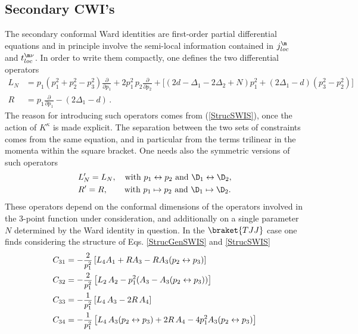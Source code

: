 \documentclass[a4paper,11pt,openright,twoside]{book}
\let\n=\nu      \let\x=\xi     \let\p=\pi      \let\r=\rho
\newcommand{\sdfrac}[2]{\mbox{\small$\displaystyle\frac{#1}{#2}$}}
\numberwithin{equation}{section}
\begin{document}
{{{\subsection{Secondary CWI's}
\label{secsection}
The secondary conformal Ward identities are first-order partial differential equations and in principle involve the semi-local information contained in $j_{loc}^\m$ and $t^{\m\n}_{loc}$. In order to write them compactly, one defines the two differential operators
\begin{align}
	L_N&= p_1(p_1^2 + p_2^2 - p_3^2) \frac{\partial}{\partial p_1} + 2 p_1^2\, p_2 \frac{\partial}{\partial p_2} + \big[ (2d - \Delta_1 - 2\Delta_2 +N)p_1^2 + (2\Delta_1-d)(p_3^2-p_2^2)  \big] \label{Ldef2} \\
	R &= p_1 \frac{\partial}{\partial p_1} - (2\Delta_1-d) \label{Rdef2}\,. 
\end{align}
The reason for introducing such operators comes from (\ref{StrucSWIS}), once the action of 
$K^\kappa$ is made explicit. The separation between the two sets of constraints comes from the same equation, and in particular from the terms trilinear in the momenta within the square bracket. One needs also the symmetric versions of such operators
\begin{align}
	&L'_N=L_N,\quad\text{with}\ p_1\leftrightarrow p_2\ \text{and}\ \D_1\leftrightarrow\D_2,\\
	&R'=R,\qquad\text{with}\ p_1\mapsto p_2\ \text{and}\ \D_1\mapsto\D_2.
\end{align}
These operators depend on the conformal dimensions of the operators involved in the 3-point function under consideration, and additionally on a single parameter $N$ determined by the Ward identity in question. In the $\braket{TJJ}$ case one finds considering the structure of Eqs. \eqref{StrucGenSWIS} and \eqref{StrucSWIS} 
\begin{equation}
	\begin{split}
		C_{31}&=-\sdfrac{2}{p_1^2}\left[L_4 A_1+R A_3-R A_3(p_2\leftrightarrow p_3)\right]\\
		C_{32}&=-\sdfrac{2}{p_1^2}\left[L_2\,A_2-p_1^2(A_3-A_3(p_2\leftrightarrow p_3))\right]\\
		C_{33}&=-\sdfrac{1}{p_1^2}\left[L_4\,A_3-2R\,A_4\right]\\
		C_{34}&=-\sdfrac{1}{p_1^2}\left[L_4\,A_3(p_2\leftrightarrow p_3)+2R\,A_4-4p_1^2A_3(p_2\leftrightarrow p_3)\right]\\
	\end{split}
\end{equation}
}}}
\end{document}
